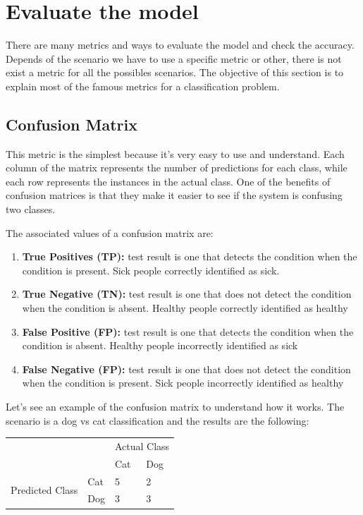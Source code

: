 \section[Evaluate the model]{Evaluate the model}
There are many metrics and ways to evaluate the model and check the accuracy. Depends of the scenario we have to use a specific metric or other, there is not exist a metric for all the possibles scenarios. 
The objective of this section is to explain most of the famous metrics for a classification problem.

\subsection[Confusion Matrix]{Confusion Matrix}
This metric is the simplest because it's very easy to use and understand. Each column of the matrix represents the number of predictions for each class, while each row represents the instances in the actual class. One of the benefits of confusion matrices is that they make it easier to see if the system is confusing two classes.

The associated values of a confusion matrix are:

\begin{enumerate}
\item \textbf{True Positives (TP):} test result is one that detects the condition when the
condition is present. Sick people correctly identified as sick.
\item \textbf{True Negative (TN):} test result is one that does not detect the condition when
the condition is absent. Healthy people correctly identified as healthy
\item \textbf{False Positive (FP):} test result is one that detects the condition when the
condition is absent. Healthy people incorrectly identified as sick
\item \textbf{False Negative (FP):} test result is one that does not detect the condition when
the condition is present. Sick people incorrectly identified as healthy
\end{enumerate}


Let's see an example of the confusion matrix to understand how it works. 
The scenario is a dog vs cat classification and the results are the following:
\begin{table}[H]
\centering
\begin{tabular}{llll}
\multicolumn{2}{l}{}                   & \multicolumn{2}{l}{Actual Class}  \\
\multicolumn{2}{l}{}                   & Cat & Dog                         \\
\multirow{2}{*}{Predicted Class} & Cat & 5   & 2                           \\
                                 & Dog & 3   & 3                          
\end{tabular}
\end{table}

